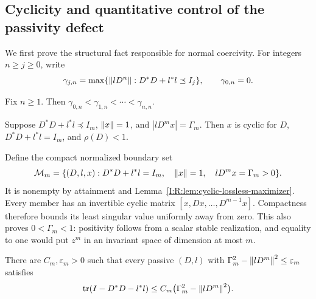 \subsection{Cyclicity and quantitative control of the passivity defect}

We first prove the structural fact responsible for normal coercivity.
For integers $n\ge j\ge0$, write
\[
 \gamma_{j,n}=\max\{\left\lVert lD^n\right\rVert:D^*D+l^*l\preceq I_j\},
 \qquad \gamma_{0,n}=0.
\]

\begin{lemma}
\label{I:R:lem:strict-dimension-improvement}
Fix $n\ge1$.  Then
$\gamma_{0,n}<\gamma_{1,n}<\cdots<\gamma_{n,n}$.
\end{lemma}


\begin{lemma}
\label{I:R:lem:cyclic-lossless-maximizer}
Suppose $D^*D+l^*l\preceq I_m$, $\left\lVert x\right\rVert=1$, and
$|lD^mx|=\Gamma_m$.  Then $x$ is cyclic for $D$,
$D^*D+l^*l=I_m$, and $\rho(D)<1$.
\end{lemma}


Define the compact normalized boundary set
\begin{equation}
 \mathcal M_m=\{(D,l,x):D^*D+l^*l=I_m,\quad \left\lVert x\right\rVert=1,
                    \quad lD^mx=\Gamma_m>0\}.
 \label{I:R:eq:boundary-maximizer-set}
\end{equation}
It is nonempty by attainment and Lemma~\ref{I:R:lem:cyclic-lossless-maximizer}.
Every member has an invertible cyclic matrix
$[x,Dx,\ldots,D^{m-1}x]$.  Compactness therefore bounds its least
singular value uniformly away from zero.  This also proves
$0<\Gamma_m<1$: positivity follows from a scalar stable realization,
and equality to one would put $z^m$ in an invariant space of dimension
at most $m$.

\begin{lemma}
\label{I:R:lem:quantitative-defect-control}
There are $C_m,\varepsilon_m>0$ such that every passive $(D,l)$ with
$\Gamma_m^2-\left\lVert lD^m\right\rVert^2\le\varepsilon_m$ satisfies
\begin{equation}
 \operatorname{tr}(I-D^*D-l^*l)
 \le C_m\bigl(\Gamma_m^2-\left\lVert lD^m\right\rVert^2\bigr).
 \label{I:R:eq:defect-gap-control}
\end{equation}
\end{lemma}


